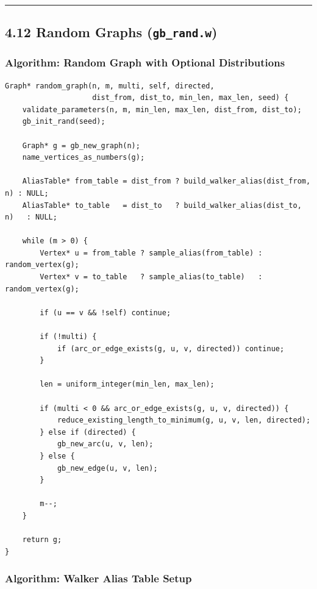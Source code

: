 \documentclass[11pt]{article}
\begin{document}
\begin{center}\rule{0.5\linewidth}{0.5pt}\end{center}

\subsection{\texorpdfstring{4.12 Random Graphs (\texttt{gb\_rand.w})}{4.12 Random Graphs (gb\_rand.w)}}\label{random-graphs-gb_rand.w}

\subsubsection{Algorithm: Random Graph with Optional Distributions}\label{algorithm-random-graph-with-optional-distributions}

\begin{verbatim}
Graph* random_graph(n, m, multi, self, directed,
                    dist_from, dist_to, min_len, max_len, seed) {
    validate_parameters(n, m, min_len, max_len, dist_from, dist_to);
    gb_init_rand(seed);

    Graph* g = gb_new_graph(n);
    name_vertices_as_numbers(g);

    AliasTable* from_table = dist_from ? build_walker_alias(dist_from, n) : NULL;
    AliasTable* to_table   = dist_to   ? build_walker_alias(dist_to, n)   : NULL;

    while (m > 0) {
        Vertex* u = from_table ? sample_alias(from_table) : random_vertex(g);
        Vertex* v = to_table   ? sample_alias(to_table)   : random_vertex(g);

        if (u == v && !self) continue;

        if (!multi) {
            if (arc_or_edge_exists(g, u, v, directed)) continue;
        }

        len = uniform_integer(min_len, max_len);

        if (multi < 0 && arc_or_edge_exists(g, u, v, directed)) {
            reduce_existing_length_to_minimum(g, u, v, len, directed);
        } else if (directed) {
            gb_new_arc(u, v, len);
        } else {
            gb_new_edge(u, v, len);
        }

        m--;
    }

    return g;
}
\end{verbatim}

\subsubsection{Algorithm: Walker Alias Table Setup}\label{algorithm-walker-alias-table-setup}
\end{document}
